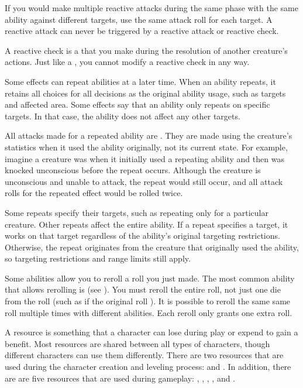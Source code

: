 If you would make multiple reactive attacks during the same phase with the same ability against different targets, use the same attack roll for each target.
A reactive attack can never be triggered by a reactive attack or reactive check.

 A reactive check is a  that you make during the resolution of another creature's actions.
Just like a , you cannot modify a reactive check in any way.

 Some effects can repeat abilities at a later time.
When an ability repeats, it retains all choices for all decisions as the original ability usage, such as targets and affected area.
Some effects say that an ability only repeats on specific targets.
In that case, the ability does not affect any other targets.

All attacks made for a repeated ability are .
They are made using the creature's statistics when it used the ability originally, not its current state.
For example, imagine a creature was \focused when it initially used a repeating ability and then was knocked unconscious before the repeat occurs.
Although the creature is unconscious and unable to attack, the repeat would still occur, and all attack rolls for the repeated effect would be rolled twice.

Some repeats specify their targets, such as repeating only for a particular creature.
Other repeats affect the entire ability.
If a repeat specifies a target, it works on that target regardless of the ability's original targeting restrictions.
Otherwise, the repeat originates from the creature that originally used the ability, so targeting restrictions and range limits still apply.

 Some abilities allow you to reroll a roll you just made.
The most common ability that allows rerolling is  (see ).
You must reroll the entire roll, not just one die from the roll (such as if the original roll ).
It is possible to reroll the same same roll multiple times with different abilities.
Each reroll only grants one extra roll.

 A resource is something that a character can lose during play or expend to gain a benefit.
Most resources are shared between all types of characters, though different characters can use them differently.
There are two resources that are used during the character creation and leveling process:  and .
In addition, there are are five resources that are used during gameplay: , , , , and .

